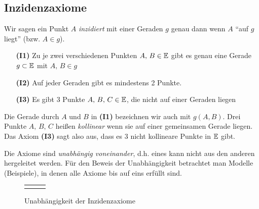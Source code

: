 
\subsection*{Inzidenzaxiome}

Wir sagen ein Punkt $A$ {\em inzidiert} mit einer Geraden $g$ genau dann wenn $A$ "`auf $g$ liegt"'
(bzw. $A\in g$).

\begin{itemize}
    \item[{\bf (I1)}] Zu je zwei verschiedenen Punkten $A,\,B\in\mathbb E$ gibt es genau eine Gerade
        $g\subset\mathbb E$ mit $A,\,B\in g$

    \item[{\bf (I2)}] Auf jeder Geraden gibt es mindestens 2 Punkte.

    \item[{\bf (I3)}] Es gibt 3 Punkte $A,\,B,\,C\in\mathbb E$, die nicht auf einer Geraden liegen
\end{itemize}

Die Gerade durch $A$ und $B$ in {\bf(I1)} bezeichnen wir auch mit $g(A,B)$. Drei Punkte $A,\,B,\,C$
heißen \emph{kollinear} wenn sie auf einer gemeinsamen Gerade liegen.  Das Axiom {\bf(I3)} sagt also
aus, dass es 3 nicht kollineare Punkte in $\mathbb E$ gibt.

Die Axiome sind {\em unabhängig voneinander}, d.h. eines kann nicht aus den anderen hergeleitet
werden. Für den Beweis der Unabhängigkeit betrachtet man Modelle (Beispiele), in denen alle Axiome
bis auf eins erfüllt sind.

\begin{center}

    \begin{figure}[h]
        \begin{tabular}{ccc}
        
        &
        
        &
        
        \end{tabular}
        \caption{Unabhängigkeit der Inzidenzaxiome}
    \end{figure}
\end{center}


